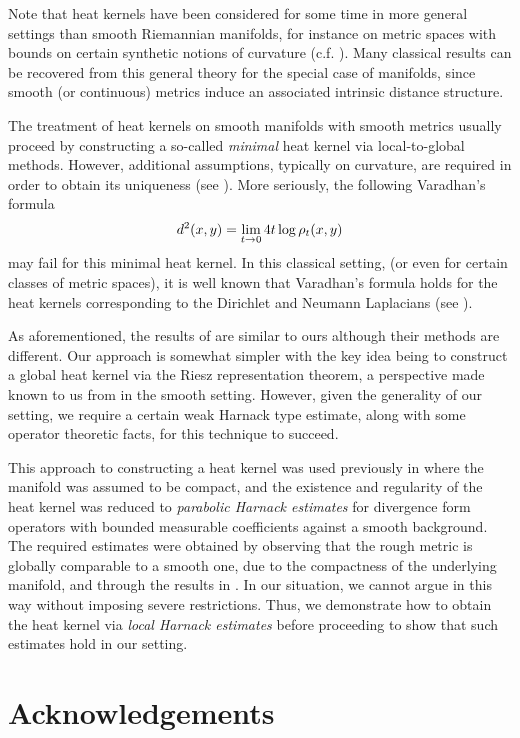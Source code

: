 \documentclass[a4paper, 12pt]{amsart}
\begin{document}
Note that heat kernels have been considered
for some time in more general settings than smooth Riemannian manifolds,
for instance on metric spaces with bounds
on certain synthetic notions of curvature (c.f. \cite{Sturm}).
Many classical results can be recovered from this general 
theory for the special case of manifolds, 
since smooth (or continuous) metrics induce an associated intrinsic
distance structure. 

The treatment of heat kernels on smooth manifolds with smooth metrics 
usually proceed by constructing
a so-called \emph{minimal} heat kernel via local-to-global methods.
However, additional assumptions, typically on curvature,
are required in order to obtain its uniqueness  (see \cite{Chavel}).
More seriously, the following Varadhan's formula
$$ d^2(x,y) = \lim_{t \to 0} 4 t \log \rho_t(x,y)$$
may fail for this minimal heat kernel. 
In this classical setting, (or even for certain classes of 
metric spaces), it is well known that Varadhan's formula holds for the heat 
kernels corresponding to the Dirichlet and Neumann Laplacians 
(see  \cite{Norris, ERS}).

As aforementioned, the results of \cite{Norris, ERS} 
are similar to ours although their methods are different. 
Our approach is somewhat simpler with the key 
idea being to construct a global heat kernel
via the Riesz representation theorem, a perspective made known to us from 
\cite{Davies} in the smooth setting. However, given the generality of our setting,
 we require a certain 
weak Harnack type estimate, along with 
some operator theoretic facts, for this technique to succeed.

This approach to constructing a heat kernel was used previously in  
\cite{BCont} where the manifold was assumed to be compact,  and 
the existence and regularity of the heat kernel was
reduced to \emph{parabolic Harnack estimates} for divergence form operators
with bounded measurable coefficients against a smooth background. 
The required estimates
were obtained by observing that  
the rough metric is globally comparable to a smooth one,
due to the compactness of the underlying manifold, and
through the  results  in \cite{SC}.
In our situation,  we cannot argue in this way without imposing
severe restrictions. Thus, we demonstrate
how to obtain the heat kernel via \emph{local Harnack estimates} 
before proceeding to show that such estimates 
hold in our setting.

\section*{Acknowledgements}
\end{document}
